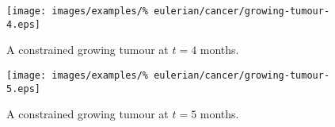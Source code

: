 \begin{figure}[!hptb]
\centering
\texttt{[image: images/examples/\%
eulerian/cancer/growing-tumour-4.eps]}
\caption{A constrained growing tumour at $t=4$ months.}
\label{tumour-growth-constrained-4}
\end{figure}

\begin{figure}[!hptb]
\centering
\texttt{[image: images/examples/\%
eulerian/cancer/growing-tumour-5.eps]}
\caption{A constrained growing tumour at $t=5$ months.}
\label{tumour-growth-constrained-5}
\end{figure}



%


